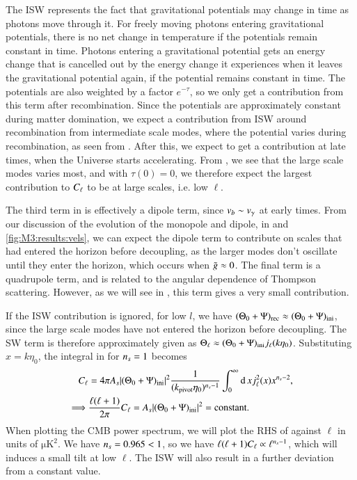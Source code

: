 The ISW represents the fact that gravitational potentials may change in time as photons move through it. For freely moving photons entering gravitational potentials, there is no net change in temperature if the potentials remain constant in time. Photons entering a gravitational potential gets an energy change that is cancelled out by the energy change it experiences when it leaves the gravitational potential again, if the potential remains constant in time.  The potentials are also weighted by a factor $e^{-\tau}$, so we only get a contribution from this term after recombination. Since the potentials are approximately constant during matter domination, we expect a contribution from ISW around recombination from intermediate scale modes, where the potential varies during recombination, as seen from . After this, we expect to get a contribution at late times, when the Universe starts accelerating. From , we see that the large scale modes varies most, and with $\tau(0)=0$, we therefore expect the largest contribution to $C_\ell$ to be at large scales, i.e. low $\ell$.  

The third term in  is effectively a dipole term, since $v_b\sim v_\gamma$ at early times. From our discussion of the evolution of the monopole and dipole, in  and \ref{fig:M3:results:vels}, we can expect the dipole term to contribute on scales that had entered the horizon before decoupling, as the larger modes don't oscillate until they enter the horizon, which occurs when $\tilde{g}\approx0$. The final term is a quadrupole term, and is related to the angular dependence of Thompson scattering. However, as we will see in , this term gives a very small contribution.

If the ISW contribution is ignored, for low $l$, we have $(\Theta_0 + \Psi)_\mathrm{rec}\approx(\Theta_0 + \Psi)_\mathrm{ini}$, since the large scale modes have not entered the horizon before decoupling. The SW term is therefore approximately given as $\Theta_\ell\approx (\Theta_0 + \Psi)_\mathrm{ini} j_\ell(k\eta_0)$. Substituting $x=k\eta_0$, the integral in  for $n_s=1$ becomes 
\begin{equation} \label{eq:M4:theory:C_ell_SW_plateau_integral}
    \begin{split}
        C_\ell &= 4\pi A_s \abs{(\Theta_0+\Psi)_\mathrm{ini}}^2 \frac{1}{(k_\mathrm{pivot} \eta_0)^{n_s-1}} \int_0^\infty \dd\, x j_\ell^2(x) x^{n_s-2}, \\
        \implies& \frac{\ell(\ell+1)}{2\pi}C_\ell = A_s \abs{(\Theta_0+\Psi)_\mathrm{ini}}^2 = \text{constant}.   
    \end{split}
\end{equation}
When plotting the CMB power spectrum, we will plot the RHS of  against $\ell$ in units of $\mathrm{\mu K^2}$. We have $n_s=0.965<1$, so we have $\ell(\ell+1)C_\ell\propto \ell^{n_s-1}$, which will induces a small tilt at low $\ell$. The ISW will also result in a further deviation from a constant value. 


